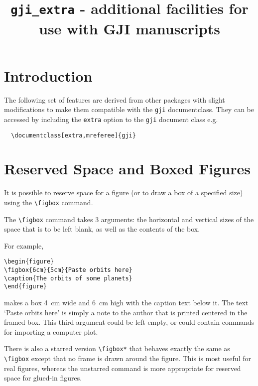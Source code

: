 \documentclass[extra,mreferee]{gji}
\title[\texttt{gji\_extra.sty} ]  
  {\texttt{gji\_extra} - additional facilities for use with GJI
manuscripts}
\author[]  {}
\begin{document}
\maketitle

\section{Introduction}
The following set of features are derived from other packages with
slight modifications to make them compatible with the \verb"gji"
documentclass. They can be accessed by including the \verb"extra"
option to the \verb"gji" document class e.g.
\begin{verbatim}
  \documentclass[extra,mreferee]{gji}
\end{verbatim}

\section{Reserved Space and Boxed Figures }

It is possible to reserve space for a figure (or to draw a box of
a specified size) using the \verb!\figbox! command.

The \verb!\figbox! command takes 3 arguments: the
horizontal and vertical sizes of the space that is to be left blank, as well
as the contents of the box.


For example,
\begin{verbatim}
\begin{figure}
\figbox{6cm}{5cm}{Paste orbits here}
\caption{The orbits of some planets}
\end{figure}
\end{verbatim}
\begin{figure*}
\caption{Illustrating the use of the figbox command for a
display of the orbits of some planets}
\end{figure*}
makes a box 4~cm wide and 6~cm high with the caption text below it.
The text `Paste orbits here' is simply a note to the author that is
printed centered in the framed box. This third argument could be left empty,
or could contain commands for importing a computer plot.  

There is also a starred version \verb!\figbox*! that behaves exactly the same
as \verb!\figbox! except that no frame is drawn around the figure. This is
most useful for real figures, whereas the unstarred command is more
appropriate for reserved space for glued-in figures.
\end{document}
